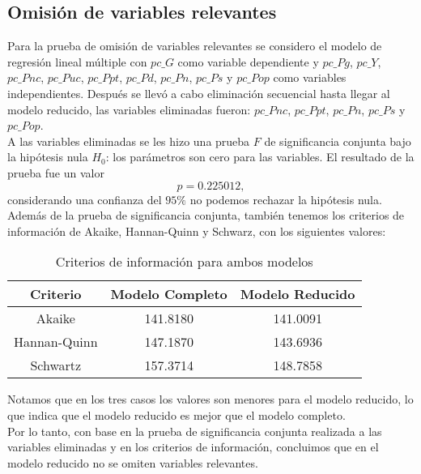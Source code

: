 \documentclass[12pt]{article}
\begin{document}


\subsection*{Omisión de variables relevantes}

Para la prueba de omisión de variables relevantes se considero el modelo de 
regresión lineal múltiple con $pc\_G$ como variable dependiente 
y $pc\_Pg$, $pc\_Y$, $pc\_Pnc$, $pc\_Puc$, $pc\_Ppt$, $pc\_Pd$, $pc\_Pn$,
 $pc\_Ps$ y $pc\_Pop$ como variables independientes. Después se llevó a cabo
 eliminación secuencial hasta llegar al modelo reducido, las variables 
 eliminadas fueron: $pc\_Pnc$, $pc\_Ppt$, $pc\_Pn$, $pc\_Ps$ y $pc\_Pop$.\\
 A las variables eliminadas se les hizo una prueba $F$ de significancia 
 conjunta bajo la hipótesis nula $H_0$: los parámetros son cero para las
 variables. El resultado de la prueba fue un valor $$p=0.225012,$$ considerando
 una confianza del $95\%$ no podemos rechazar la hipótesis nula.\\
 Además de la prueba de significancia conjunta, también tenemos los criterios
 de información de Akaike, Hannan-Quinn y Schwarz, con los siguientes valores:

 \begin{table}[h]
    \centering
    \begin{tabular}{|c|c|c|}
        \hline
        \hline
        \textbf{Criterio} & \textbf{Modelo Completo} & \textbf{Modelo Reducido} \\
        \hline
        Akaike & 141.8180 & 141.0091 \\
        Hannan-Quinn & 147.1870 & 143.6936 \\
        Schwartz & 157.3714 & 148.7858 \\
        \hline
        \hline
    \end{tabular}
    \caption{Criterios de información para ambos modelos}
 \end{table}

Notamos que en los tres casos los valores son menores para el modelo reducido,
lo que indica que el modelo reducido es mejor que el modelo completo.\\
Por lo tanto, con base en la prueba de significancia conjunta realizada a
las variables eliminadas y en los criterios de información, concluimos
que en el modelo reducido no se omiten variables relevantes.
\end{document}
